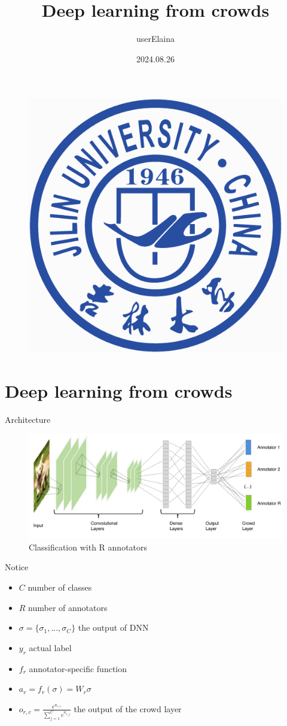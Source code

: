 \documentclass{beamer}
\author{userElaina}
\title{Deep learning from crowds}
\institute{School of AI}
\date{2024.08.26}
\begin{document}
\kaishu
\begin{frame}
    \titlepage
    \begin{figure}[htpb]
        \begin{center}
            \includegraphics[width=0.15\linewidth]{pic/Jilin_University_Logo.eps}
        \end{center}
    \end{figure}
\end{frame}


\section{Deep learning from crowds}

\begin{frame}{Architecture}
    \begin{figure}[c]
        \centering
        \includegraphics[width=\textwidth]{pic/8.png}
        \caption{Classification with R annotators}
    \end{figure}
\end{frame}

\begin{frame}{Notice}
    \begin{itemize}
        \item $C$ number of classes
        \item $R$ number of annotators
        \item $\sigma = \{\sigma_1, ..., \sigma_C\}$ the output of DNN
        \item $y_r$ actual label
        \item $f_r$ annotator-specific function
        \item $a_r = f_r(\sigma) = W_r \sigma$
        \item $o_{r,c} = \frac{e^{a_{r,c}}}{\sum_{j=1}^C e^{a_{r,j}}}$ the output of the crowd layer
    \end{itemize}
\end{frame}
\end{document}
